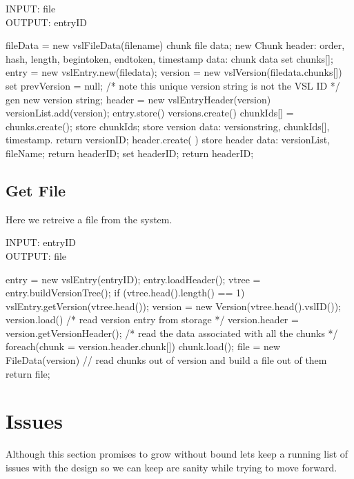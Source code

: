 \documentclass[10pt]{article}
\begin{document}
INPUT: file\\
OUTPUT: entryID\\

\begin{verbatimtab}[3]
fileData = new vslFileData(filename)
{
	chunk file data;
	new Chunk {
		header: order, hash, length, begintoken, endtoken, timestamp	
		data: chunk data
	}
	set chunks[];
}
entry = new vslEntry.new(filedata);
{
	version = new vslVersion(filedata.chunks[])
	{
		set prevVersion = null;
		/* note this unique version string is not the VSL ID */
		gen new version string;
	}
	header = new vslEntryHeader(version)
	{
		versionList.add(version);
	}
}
entry.store()
{
	versions.create()
	{
		chunkIds[] = chunks.create();
		store chunkIds;
		store version data: versionstring, chunkIds[], timestamp.
		return versionID;
	}
	header.create( )
	{
		 store header data: versionList, fileName;
		 return headerID;
	}
	set headerID;
	return headerID;
}
\end{verbatimtab}



\subsection{Get File}

Here we retreive a file from the system.

INPUT: entryID\\
OUTPUT: file\\

\begin{verbatimtab}[3]
entry = new vslEntry(entryID);
entry.loadHeader();
vtree = entry.buildVersionTree();
if (vtree.head().length() == 1)
{
	vslEntry.getVersion(vtree.head());
	{
		version = new Version(vtree.head().vslID());
		version.load()
		{
			/* read version entry from storage */
			version.header = version.getVersionHeader();
			/* read the data associated with all the chunks */
			foreach(chunk = version.header.chunk[])
			{
				chunk.load();
			}
		}
	}
	file = new FileData(version)
	{
		// read chunks out of version and build a file out of them
	}
	return file;
}
\end{verbatimtab}

\section{Issues}

Although this section promises to grow without bound lets keep a running list of issues with the design so we can keep are sanity while trying to move forward.
\end{document}
